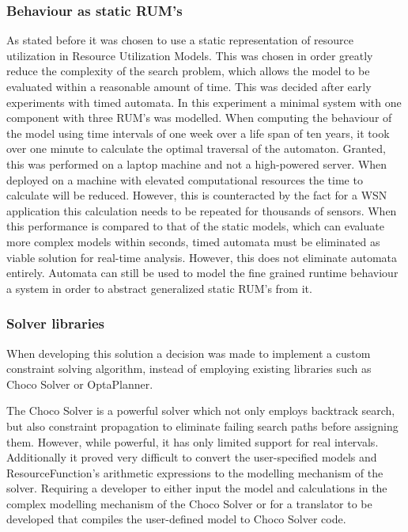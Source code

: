 \subsubsection{Behaviour as static RUM's}
As stated before it was chosen to use a static representation of resource utilization in Resource Utilization Models. This was chosen in order greatly reduce the complexity of the search problem, which allows the model to be evaluated within a reasonable amount of time. This was decided after early experiments with timed automata. In this experiment a minimal system with one component with three RUM's was modelled. When computing the behaviour of the model using time intervals of one week over a life span of ten years, it took over one minute to calculate the optimal traversal of the automaton. Granted, this was performed on a laptop machine and not a high-powered server. When deployed on a machine with elevated computational resources the time to calculate will be reduced. However, this is counteracted by the fact for a WSN application this calculation needs to be repeated for thousands of sensors. When this performance is compared to that of the static models, which can evaluate more complex models within seconds, timed automata must be eliminated as viable solution for real-time analysis. However, this does not eliminate automata entirely. Automata can still be used to model the fine grained runtime behaviour a system in order to abstract generalized static RUM's from it.

\subsubsection{Solver libraries}
When developing this solution a decision was made to implement a custom constraint solving algorithm, instead of employing existing libraries such as Choco Solver\cite{web:choco} or OptaPlanner\cite{web:opta}. 

The Choco Solver is a powerful solver which not only employs backtrack search, but also constraint propagation to eliminate failing search paths before assigning them. However, while powerful, it has only limited support for real intervals\cite{choco_ibex}. Additionally it proved very difficult to convert the user-specified models and ResourceFunction's arithmetic expressions to the modelling mechanism of the solver. Requiring a developer to either input the model and calculations in the complex modelling mechanism of the Choco Solver or for a translator to be developed that compiles the user-defined model to Choco Solver code.

